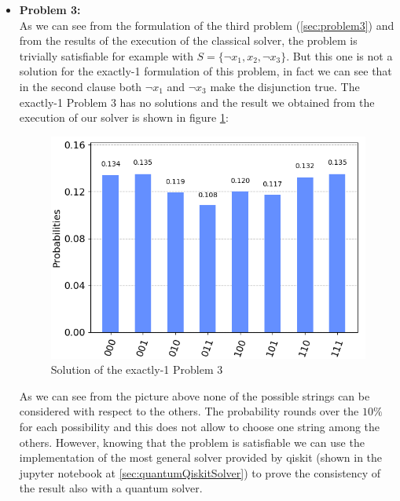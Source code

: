 \documentclass[english]{article}
\begin{document}
\begin{itemize}
					\item \textbf{Problem 3:} \\
						As we can see from the formulation of the third problem (\ref{sec:problem3}) and from the results of the execution of the classical solver, the problem is trivially satisfiable for example with $S = \{\neg x_1, x_2, \neg x_3\}$. But this one is not a solution for the exactly-1 formulation of this problem, in fact we can see that in the second clause both $\neg x_1$ and $\neg x_3$ make the disjunction true. The exactly-1 Problem 3 has no solutions and the result we obtained from the execution of our solver is shown in figure \ref{fig:problem3Solution}:
						\begin{figure}[h]
							\centering
							\includegraphics[scale=0.45]{Problem_3_Solution.png}
							\caption{
								\label{fig:problem3Solution}
								Solution of the exactly-1 Problem 3
							}
						\end{figure}
					
						As we can see from the picture above none of the possible strings can be considered with respect to the others. The probability rounds over the $10\%$ for each possibility and this does not allow to choose one string among the others. However, knowing that the problem is satisfiable we can use the implementation of the most general solver provided by qiskit (shown in the jupyter notebook at \ref{sec:quantumQiskitSolver}) to prove the consistency of the result also with a quantum solver.
						

\end{itemize}
\end{document}
